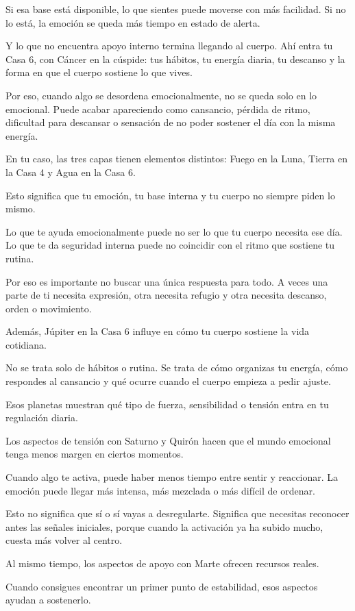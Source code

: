 \documentclass[11pt,a4paper]{article}
\begin{document}
Si esa base está disponible, lo que sientes puede moverse con más facilidad.
Si no lo está, la emoción se queda más tiempo en estado de alerta.

Y lo que no encuentra apoyo interno termina llegando al cuerpo. Ahí entra tu Casa 6, con Cáncer en la cúspide: tus hábitos, tu energía diaria, tu descanso y la forma en que el cuerpo sostiene lo que vives.

Por eso, cuando algo se desordena emocionalmente, no se queda solo en lo emocional. Puede acabar apareciendo como cansancio, pérdida de ritmo, dificultad para descansar o sensación de no poder sostener el día con la misma energía.

En tu caso, las tres capas tienen elementos distintos: Fuego en la Luna, Tierra en la Casa 4 y Agua en la Casa 6.

Esto significa que tu emoción, tu base interna y tu cuerpo no siempre piden lo mismo.

Lo que te ayuda emocionalmente puede no ser lo que tu cuerpo necesita ese día. Lo que te da seguridad interna puede no coincidir con el ritmo que sostiene tu rutina.

Por eso es importante no buscar una única respuesta para todo. A veces una parte de ti necesita expresión, otra necesita refugio y otra necesita descanso, orden o movimiento.

Además, Júpiter en la Casa 6 influye en cómo tu cuerpo sostiene la vida cotidiana.

No se trata solo de hábitos o rutina. Se trata de cómo organizas tu energía, cómo respondes al cansancio y qué ocurre cuando el cuerpo empieza a pedir ajuste.

Esos planetas muestran qué tipo de fuerza, sensibilidad o tensión entra en tu regulación diaria.

Los aspectos de tensión con Saturno y Quirón hacen que el mundo emocional tenga menos margen en ciertos momentos.

Cuando algo te activa, puede haber menos tiempo entre sentir y reaccionar. La emoción puede llegar más intensa, más mezclada o más difícil de ordenar.

Esto no significa que sí o sí vayas a desregularte. Significa que necesitas reconocer antes las señales iniciales, porque cuando la activación ya ha subido mucho, cuesta más volver al centro.

Al mismo tiempo, los aspectos de apoyo con Marte ofrecen recursos reales.

Cuando consigues encontrar un primer punto de estabilidad, esos aspectos ayudan a sostenerlo.
\end{document}
